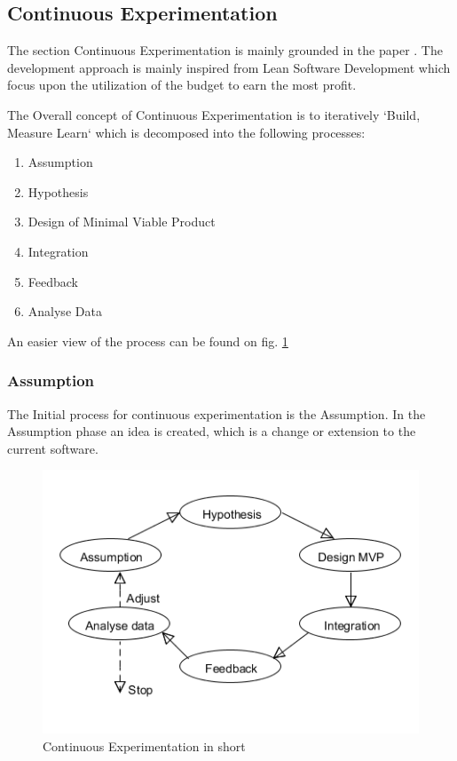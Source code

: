 \documentclass{sig-alternate}
\begin{document}
\subsection{Continuous Experimentation}
The section Continuous Experimentation is mainly grounded in the paper \cite{bowman:reasoning}.
The development approach is mainly inspired from Lean Software Development which focus upon 
the utilization of the budget to earn the most profit.

The Overall concept of Continuous Experimentation is to iteratively `Build, Measure Learn` which is
decomposed into the following processes: 
\begin{enumerate}
\item Assumption
\item Hypothesis
\item Design of Minimal Viable Product
\item Integration
\item Feedback
\item Analyse Data
\end{enumerate}

An easier view of the process can be found on fig. \ref{fig:continuousdev}

\subsubsection{Assumption}
\label{cx:assumption}
The Initial process for continuous experimentation is the Assumption.
In the Assumption phase an idea is created, which is a change or extension to the current software.

\begin{figure}
\centering
\caption{Continuous Experimentation in short}
\label{fig:continuousdev}
\includegraphics[scale=0.5]{Umlet/conexp}
\end{figure}
\end{document}
